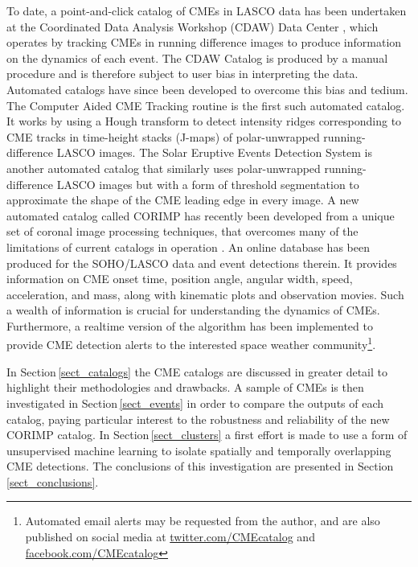 \documentclass[referee,a4paper,12pt,traditabstract]{swsc}
\begin{document}
\begin{linenumbers}
To date, a point-and-click catalog of CMEs in LASCO data has been undertaken at the Coordinated Data Analysis Workshop (CDAW) Data Center \citep{2009EM&P..104..295G}, which operates by tracking CMEs in running difference images to produce information on the dynamics of each event. The CDAW Catalog is produced by a manual procedure and is therefore subject to user bias in interpreting the data. Automated catalogs have since been developed to overcome this bias and tedium. The Computer Aided CME Tracking routine \cite[CACTus;][]{2004A&A...425.1097R} is the first such automated catalog. It works by using a Hough transform \citep{Hough1962} to detect intensity ridges corresponding to CME tracks in time-height stacks (J-maps) of polar-unwrapped running-difference LASCO images. The Solar Eruptive Events Detection System \cite[SEEDS;][]{2008SoPh..248..485O} is another automated catalog that similarly uses polar-unwrapped running-difference LASCO images but with a form of threshold segmentation to approximate the shape of the CME leading edge in every image. A new automated catalog called CORIMP has recently been developed from a unique set of coronal image processing techniques, that overcomes many of the limitations of current catalogs in operation \citep{2012ApJ...752..144M,2012ApJ...752..145B}. An online database has been produced for the SOHO/LASCO data and event detections therein. It provides information on CME onset time, position angle, angular width, speed, acceleration, and mass, along with kinematic plots and observation movies. Such a wealth of information is crucial for understanding the dynamics of CMEs. Furthermore, a realtime version of the algorithm has been implemented to provide CME detection alerts to the interested space weather community\footnote{Automated email alerts may be requested from the author, and are also published on social media at \href{https://www.twitter.com/CMEcatalog}{twitter.com/CMEcatalog} and \href{https://www.facebook.com/CMEcatalog}{facebook.com/CMEcatalog}}.

In Section\,\ref{sect_catalogs} the CME catalogs are discussed in greater detail to highlight their methodologies and drawbacks. A sample of CMEs is then investigated in Section\,\ref{sect_events} in order to compare the outputs of each catalog, paying particular interest to the robustness and reliability of the new CORIMP catalog. In Section\,\ref{sect_clusters} a first effort is made to use a form of unsupervised machine learning to isolate spatially and temporally overlapping CME detections. The conclusions of this investigation are presented in Section\,\ref{sect_conclusions}.


\end{linenumbers}
\end{document}
